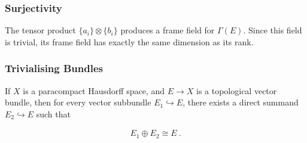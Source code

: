 \begin{frame}
    \frametitle{Surjectivity}


    The tensor product \(\{a_i\} \otimes \{b_i\}\) produces a frame field for
    \(\Gamma(E)\). Since this field is trivial, its frame field has exactly the
    same dimension as its rank.




\end{frame}

\begin{frame}
    \frametitle{Trivialising Bundles}

    \begin{theorem}
        If \(X\) is a paracompact Hausdorff space, and \(E \to X\) is a
        topological vector bundle, then for every vector subbundle \(E_1
        \hookrightarrow E\), there exists a direct summand \(E_2 \hookrightarrow
        E\) such that 

        \begin{gather*}
            E_1 \oplus E_2 \cong E~.
        \end{gather*}

    \end{theorem}


\end{frame}

